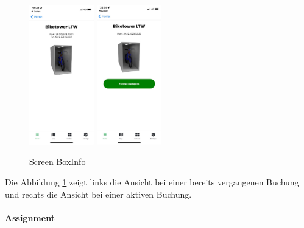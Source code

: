 \begin{figure}[H]
    \centering
    \includegraphics[width=0.25\textwidth]{images/app-screenshots/screenboxinfo.png}
    \includegraphics[width=0.25\textwidth]{images/app-screenshots/screenboxinfov.png}
    \caption{Screen BoxInfo}
    \label{fig:screenboxinfo}
\end{figure}
Die Abbildung \ref{fig:screenboxinfo} zeigt links die Ansicht bei einer bereits vergangenen Buchung und rechts die Ansicht bei einer aktiven Buchung.\\


\paragraph{Assignment}

